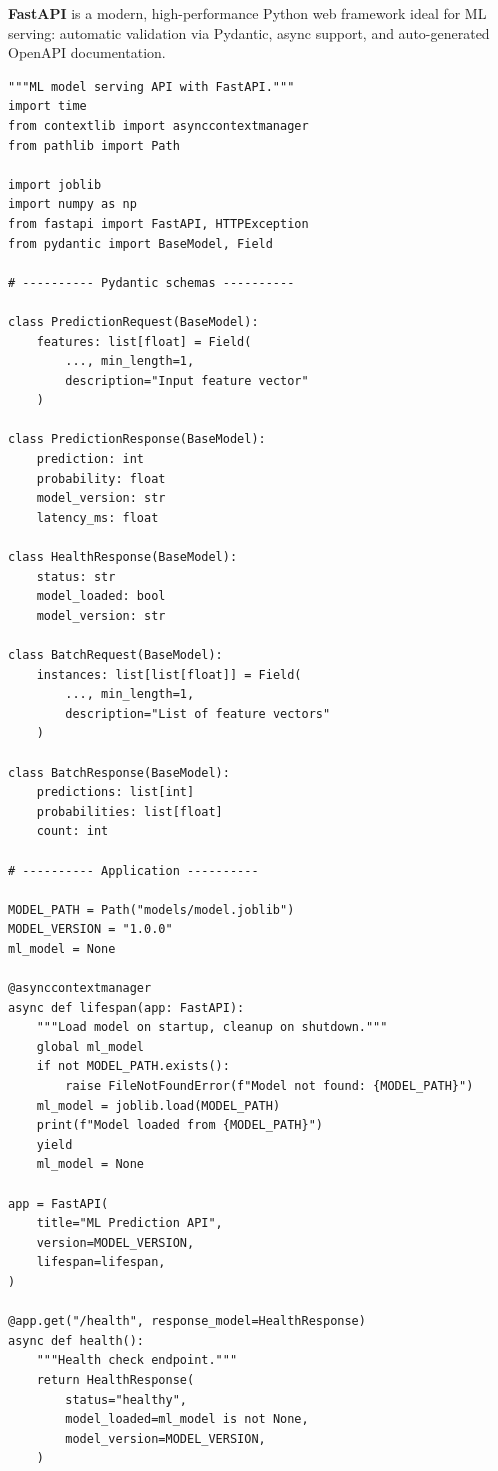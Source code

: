 \textbf{FastAPI} is a modern, high-performance Python
web framework ideal for ML serving: automatic validation via Pydantic,
async support, and auto-generated OpenAPI documentation.

\begin{codeblock}[title=\textbf{Complete FastAPI ML serving application}]
\begin{verbatim}
"""ML model serving API with FastAPI."""
import time
from contextlib import asynccontextmanager
from pathlib import Path

import joblib
import numpy as np
from fastapi import FastAPI, HTTPException
from pydantic import BaseModel, Field

# ---------- Pydantic schemas ----------

class PredictionRequest(BaseModel):
    features: list[float] = Field(
        ..., min_length=1,
        description="Input feature vector"
    )

class PredictionResponse(BaseModel):
    prediction: int
    probability: float
    model_version: str
    latency_ms: float

class HealthResponse(BaseModel):
    status: str
    model_loaded: bool
    model_version: str

class BatchRequest(BaseModel):
    instances: list[list[float]] = Field(
        ..., min_length=1,
        description="List of feature vectors"
    )

class BatchResponse(BaseModel):
    predictions: list[int]
    probabilities: list[float]
    count: int

# ---------- Application ----------

MODEL_PATH = Path("models/model.joblib")
MODEL_VERSION = "1.0.0"
ml_model = None

@asynccontextmanager
async def lifespan(app: FastAPI):
    """Load model on startup, cleanup on shutdown."""
    global ml_model
    if not MODEL_PATH.exists():
        raise FileNotFoundError(f"Model not found: {MODEL_PATH}")
    ml_model = joblib.load(MODEL_PATH)
    print(f"Model loaded from {MODEL_PATH}")
    yield
    ml_model = None

app = FastAPI(
    title="ML Prediction API",
    version=MODEL_VERSION,
    lifespan=lifespan,
)

@app.get("/health", response_model=HealthResponse)
async def health():
    """Health check endpoint."""
    return HealthResponse(
        status="healthy",
        model_loaded=ml_model is not None,
        model_version=MODEL_VERSION,
    )


\end{verbatim}
\end{codeblock}
